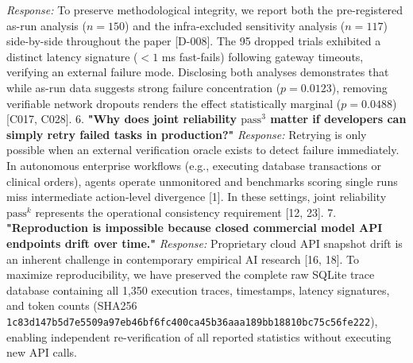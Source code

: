 \documentclass[11pt,letterpaper]{article}
\begin{document}
   \emph{Response:} To preserve methodological integrity, we report both the pre-registered as-run analysis ($n=150$) and the infra-excluded sensitivity analysis ($n=117$) side-by-side throughout the paper [D-008]. The 95 dropped trials exhibited a distinct latency signature ($<1$ ms fast-fails) following gateway timeouts, verifying an external failure mode. Disclosing both analyses demonstrates that while as-run data suggests strong failure concentration ($p=0.0123$), removing verifiable network dropouts renders the effect statistically marginal ($p=0.0488$) [C017, C028].
6. \textbf{"Why does joint reliability $\text{pass}^{3}$ matter if developers can simply retry failed tasks in production?"}  
   \emph{Response:} Retrying is only possible when an external verification oracle exists to detect failure immediately. In autonomous enterprise workflows (e.g., executing database transactions or clinical orders), agents operate unmonitored and benchmarks scoring single runs miss intermediate action-level divergence [1]. In these settings, joint reliability $\text{pass}^k$ represents the operational consistency requirement [12, 23].
7. \textbf{"Reproduction is impossible because closed commercial model API endpoints drift over time."}  
   \emph{Response:} Proprietary cloud API snapshot drift is an inherent challenge in contemporary empirical AI research [16, 18]. To maximize reproducibility, we have preserved the complete raw SQLite trace database containing all 1,350 execution traces, timestamps, latency signatures, and token counts (SHA256 \nolinkurl{1c83d147b5d7e5509a97eb46bf6fc400ca45b36aaa189bb18810bc75c56fe222}), enabling independent re-verification of all reported statistics without executing new API calls.
\end{document}
